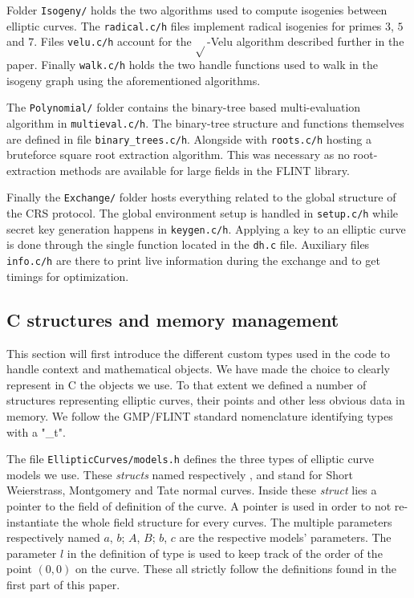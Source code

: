 \documentclass[../main.tex]{subfilesubs}
\begin{document}
Folder \texttt{Isogeny/} holds the two algorithms used to compute isogenies between elliptic curves.
The \texttt{radical.c/h} files implement radical isogenies for primes $3$, $5$ and $7$.
Files \texttt{velu.c/h} account for the $\sqrt{}$-Velu algorithm described further in the paper.
Finally \texttt{walk.c/h} holds the two handle functions used to walk in the isogeny graph using the aforementioned algorithms.

The \texttt{Polynomial/} folder contains the binary-tree based multi-evaluation algorithm in \texttt{multieval.c/h}.
The binary-tree structure and functions themselves are defined in file \texttt{binary\_trees.c/h}.
Alongside with \texttt{roots.c/h} hosting a bruteforce square root extraction algorithm.
This was necessary as no root-extraction methods are available for large fields in the FLINT library.

Finally the \texttt{Exchange/} folder hosts everything related to the global structure of the CRS protocol.
The global environment setup is handled in \texttt{setup.c/h} while secret key generation happens in \texttt{keygen.c/h}.
Applying a key to an elliptic curve is done through the single function located in the \texttt{dh.c} file.
Auxiliary files \texttt{info.c/h} are there to print live information during the exchange  and to get timings for optimization.











\subsection{C structures and memory management}
This section will first introduce the different custom types used in the code to handle context and mathematical objects.
We have made the choice to clearly represent in C the objects we use.
To that extent we defined a number of structures representing elliptic curves, their points and other less obvious data in memory.
We follow the GMP/FLINT standard nomenclature identifying types with a "\_t".

The file \texttt{EllipticCurves/models.h} defines the three types of elliptic curve models we use.
These \textit{structs} named respectively ,  and  stand for Short Weierstrass, Montgomery and Tate normal curves.
Inside these \textit{struct} lies a  pointer to the field of definition of the curve.
A pointer is used in order to not re-instantiate the whole field structure for every curves.
The multiple  parameters respectively named $a$, $b$; $A$, $B$; $b$, $c$ are the respective models' parameters.
The  parameter $l$ in the definition of type  is used to keep track of the order of the point $(0, 0)$ on the curve.
These all strictly follow the definitions found in the first part of this paper.
\end{document}

